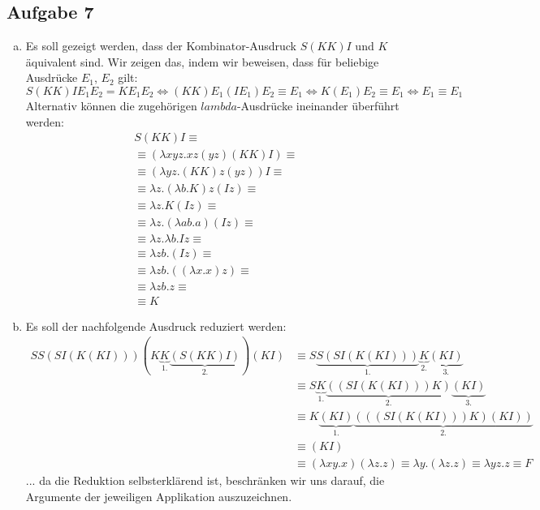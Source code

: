 \documentclass[11, 12pt]{article}
\begin{document}
\begin{enumerate}[(a)]
\section*{Aufgabe 7}
\begin{enumerate}[(a)]
	\item Es soll gezeigt werden, dass der Kombinator-Ausdruck $S(KK)I$ und $K$ äquivalent sind. Wir zeigen das, indem wir beweisen, dass für beliebige Ausdrücke $E_1$, $E_2$ gilt:
	\begin{equation*}
		S(KK)IE_1 E_2 = K E_1 E_2\Leftrightarrow (KK) E_1 (I E_1) E_2 \equiv E_1 \Leftrightarrow K (E_1) E_2 \equiv E_1\Leftrightarrow E_1\equiv E_1
	\end{equation*}
	Alternativ können die zugehörigen $lambda$-Ausdrücke ineinander überführt werden:
	\begin{align*}
	& S(KK)I \equiv &&\tag*{S Anwenden} \\
	& \equiv (\lambda xyz.xz(yz)(KK)I) \equiv &&\tag*{Vereinfachen} \\
	& \equiv (\lambda yz.(KK)z(yz))I \equiv &&\tag*{Vereinfachen} \\
	& \equiv \lambda z.(\lambda b.K)z(Iz) \equiv &&\tag*{Vereinfachen} \\
	& \equiv \lambda z.K(Iz) \equiv &&\tag*{K Anwenden} \\
	& \equiv \lambda z.(\lambda ab.a)(Iz) \equiv &&\tag*{Vereinfachen} \\
	& \equiv \lambda z. \lambda b.Iz \equiv &&\tag*{Vereinfachen} \\
	& \equiv \lambda zb.(Iz) \equiv &&\tag*{I Anwenden} \\
	& \equiv \lambda zb.((\lambda x.x)z) \equiv &&\tag*{Vereinfachen} \\
	& \equiv \lambda zb.z \equiv &&\tag*{K Anwenden} \\
	& \equiv K
	\end{align*}
	\item Es soll der nachfolgende Ausdruck reduziert werden:
	\begin{align*}
		SS(SI(K(KI)))(K\underbrace{K}_{1.}\underbrace{(S(KK)I)}_{2.})(KI)&\equiv S\underbrace{S(SI(K(KI)))}_{1.}\underbrace{K}_{2.}\underbrace{(KI)}_{3.}\\
		&\equiv S\underbrace{K}_{1.}\underbrace{((SI(K(KI)))K)}_{2.}\underbrace{(KI)}_{3.}\\
		&\equiv K\underbrace{(KI)}_{1.}\underbrace{(((SI(K(KI)))K)(KI))}_{2.}\\
		&\equiv (KI)\\
		&\equiv (\lambda xy.x)(\lambda z.z)\equiv \lambda y.(\lambda z.z)\equiv \lambda yz.z\equiv F
	\end{align*}
	... da die Reduktion selbsterklärend ist, beschränken wir uns darauf, die Argumente der jeweiligen Applikation auszuzeichnen.
\end{enumerate}

\end{enumerate}
\end{document}
